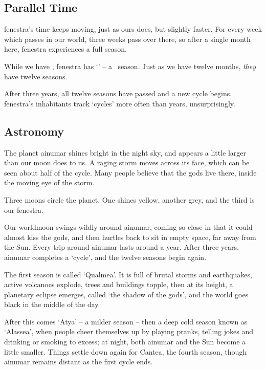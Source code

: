 \begin{multicols}{2}


\subsection{Parallel Time}

\Gls{fenestra}'s time keeps moving, just as ours does, but slightly faster.
For every week which passes in our world, three weeks pass over there, so after a single month here, \gls{fenestra} experiences a full season.

While we have \trackMonth, \gls{fenestra} has `\showSeason' -- a \showTemperature\ season.
Just as we have twelve months, \emph{they} have twelve seasons.

After three years, all twelve seasons have passed and a new cycle begins.
\Gls{fenestra}'s inhabitants track `cycles' more often than years, unsurprisingly.

\subsection{Astronomy}

The planet \gls{ainumar} shines bright in the night sky, and appears a little larger than our moon does to us.
A raging storm moves across its face, which can be seen about half of the cycle.
Many people believe that the gods live there, inside the moving eye of the storm.

Three moons circle the planet.
One shines yellow, another grey, and the third is our \gls{fenestra}.

Our worldmoon swings wildly around \gls{ainumar}, coming so close in that it could almost kiss the gods, and then hurtles back to sit in empty space, far away from the Sun.
Every trip around \gls{ainumar} lasts around a year.
After three years, \gls{ainumar} completes a `cycle', and the twelve seasons begin again.

The first season is called `Qualmea'.
It is full of brutal storms and earthquakes, active volcanoes explode, trees and buildings topple, then at its height, a planetary eclipse emerges, called `the shadow of the gods', and the world goes black in the middle of the day.

After this comes `Atya' -- a milder season -- then a deep cold season known as `Alassea', when people cheer themselves up by playing pranks, telling jokes and drinking or smoking to excess; at night, both \gls{ainumar} and the Sun become a little smaller.
Things settle down again for Cantea, the fourth season, though \gls{ainumar} remains distant as the first cycle ends.


\end{multicols}

